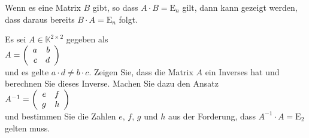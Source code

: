 \remark
Wenn es eine Matrix $B$ gibt, so dass $A \cdot B = \mathrm{E}_n$ gilt, dann kann gezeigt werden, dass daraus
bereits $B \cdot A = \mathrm{E}_n$ folgt. \eox

\exercise
Es sei $A \in \mathbb{K}^{2 \times 2}$ gegeben als
\\[0.2cm]
\hspace*{1.3cm}
$A = \left(
       \begin{array}[c]{rr}
         a & b \\
         c & d 
       \end{array}
     \right)
$
\\[0.2cm]
und es gelte $a \cdot d \not= b \cdot c$.  Zeigen Sie, dass die Matrix $A$ ein Inverses hat und
berechnen Sie dieses Inverse.
Machen Sie dazu den Ansatz
\\[0.2cm]
\hspace*{1.3cm}
$A^{-1}  = \left(
       \begin{array}[c]{rr}
         e & f \\
         g & h 
       \end{array}
     \right)
$
\\[0.2cm]
und bestimmen Sie die Zahlen $e$, $f$, $g$ und $h$ aus der Forderung, dass $A^{-1} \cdot A = \mathrm{E}_2$
gelten muss.
\eoxs

